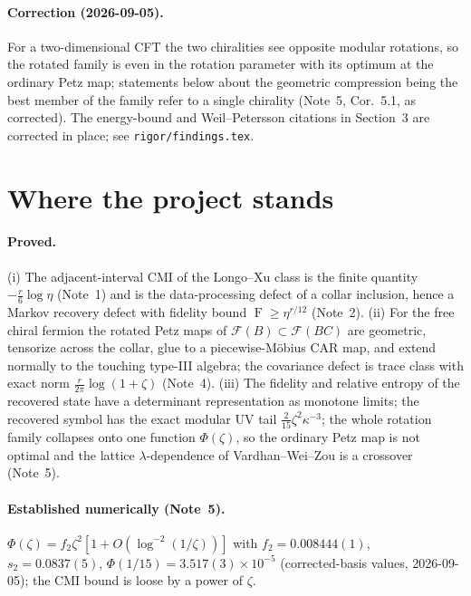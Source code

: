 \documentclass[11pt]{article}
\theoremstyle{accent}
\theoremstyle{definition}
\newcommand{\cF}{\mathcal{F}}
\newcommand{\Fid}{\operatorname{F}}
\begin{document}
\paragraph{Correction (2026-09-05).} For a two-dimensional CFT the two chiralities see opposite modular rotations, so the rotated family is even in the rotation parameter with its optimum at the ordinary Petz map; statements below about the geometric compression being the best member of the family refer to a single chirality (Note~5, Cor.~5.1, as corrected).  The energy-bound and Weil--Petersson citations in Section~3 are corrected in place; see \texttt{rigor/findings.tex}.

\tableofcontents
\clearpage
\section{Where the project stands}\label{sec:status}

\paragraph{Proved.}
(i) The adjacent-interval CMI of the Longo--Xu class is the finite quantity \(-\frac r6\log\eta\) (Note~1) and is the data-processing defect of a collar inclusion, hence a Markov recovery defect with fidelity bound \(\Fid\ge\eta^{r/12}\) (Note~2).
(ii) For the free chiral fermion the rotated Petz maps of \(\cF(B)\subset\cF(BC)\) are geometric, tensorize across the collar, glue to a piecewise-M\"obius CAR map, and extend normally to the touching type-III algebra; the covariance defect is trace class with exact norm \(\frac r{2\pi}\log(1+\zeta)\) (Note~4).
(iii) The fidelity and relative entropy of the recovered state have a determinant representation as monotone limits; the recovered symbol has the exact modular UV tail \(\frac2{15}\zeta^2\kappa^{-3}\); the whole rotation family collapses onto one function \(\Phi(\zeta)\), so the ordinary Petz map is not optimal and the lattice \(\lambda\)-dependence of Vardhan--Wei--Zou is a crossover (Note~5).

\paragraph{Established numerically (Note~5).}
\(\Phi(\zeta)=f_2\zeta^2[1+O(\log^{-2}(1/\zeta))]\) with \(f_2=0.008444(1)\), \(s_2=0.0837(5)\), \(\Phi(1/15)=3.517(3)\times10^{-5}\) (corrected-basis values, 2026-09-05); the CMI bound is loose by a power of \(\zeta\).
\end{document}
